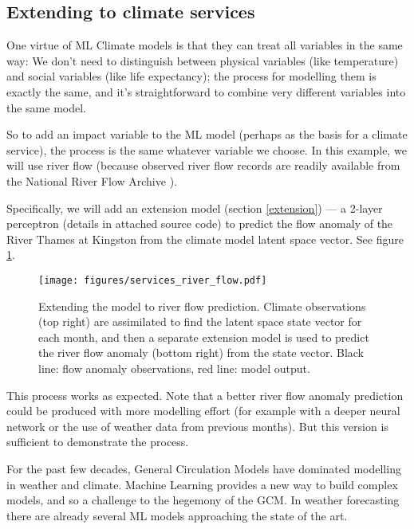 \documentclass[gmd,manuscript]{copernicus}
\begin{document}
\subsection{Extending to climate services}

One virtue of ML Climate models is that they can treat all variables in the same way: We don't need to distinguish between physical variables (like temperature) and social variables (like life expectancy); the process for modelling them is exactly the same, and it's straightforward to combine very different variables into the same model.

So to add an impact variable to the ML model (perhaps as the basis for a climate service), the process is the same whatever variable we choose. In this example, we will use river flow (because observed river flow records are readily available from the National River Flow Archive \citep{NRFA}).

Specifically, we will add an extension model (section \ref{extension}) --- a 2-layer perceptron (details in attached source code) to predict the flow anomaly of the River Thames at Kingston \citep{NRFA-Kingston} from the climate model latent space vector. See figure \ref{services_river_flow}.

\begin{figure}[h]
\texttt{[image: figures/services\_river\_flow.pdf]}
\caption{Extending the model to river flow prediction. Climate observations (top right) are assimilated to find the latent space state vector for each month, and then a separate extension model is used to predict the river flow anomaly (bottom right) from the state vector. Black line: flow anomaly observations, red line: model output.}
\label{services_river_flow}
\end{figure}
         
This process works as expected. Note that a better river flow anomaly prediction could be produced with more modelling effort (for example with a deeper neural network or the use of weather data from previous months). But this version is sufficient to demonstrate the process.


\conclusions  %

For the past few decades, General Circulation Models have dominated modelling in weather and climate. Machine Learning provides a new way to build complex models, and so a challenge to the hegemony of the GCM. In weather forecasting there are already several ML models approaching the state of the art. 
\end{document}
